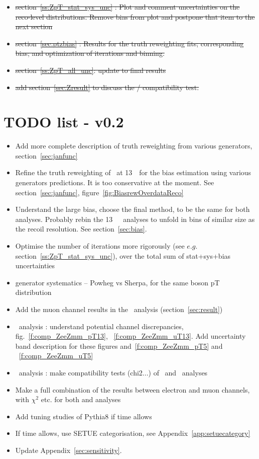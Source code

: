 \begin{itemize}
\begin{itemize}
    \item  {\sout{\color{red} section~\ref{ss:ZpT_stat_sys_unc} : Plot and comment uncertainties on the reco-level distributions. Remove bias from plot and postpone that item to the next section}}
    \item  {\sout{\color{red} section~\ref{sec:ptzbias} : Results for the truth reweighting fits; corresponding bias; and optimization of iterations and binning.}}
    \item  {\sout{\color{red} section~\ref{ss:ZpT_all_unc}: update to final results}}
    \item  {\sout{\color{red} add section~\ref{sec:Zresult} to discuss the \ut / \ptdilep compatibility test.}}
    \end{itemize}
\end{itemize}


\section*{TODO list - v0.2}

\begin{itemize}
\item Add more complete description of truth reweighting from various generators, section~\ref{sec:janfunc}
\item Refine the truth reweighting of \Wplus\ at 13~\TeV\ for the bias estimation using various generators predictions. It is too conservative at the moment. See section~\ref{sec:janfunc}, figure~\ref{fig:BiasrewOverdataReco}
\item Understand the large bias, choose the final method, to be the same for both analyses. Probably rebin the 13~\TeV\ \ut\ analyses to unfold in bins of similar size as the recoil resolution. See section~\ref{sec:bias}.
\item Optimise the number of iterations more rigorously (see $e.g.$ section~\ref{ss:ZpT_stat_sys_unc}), over the total sum of stat+sys+bias uncertainties
\item generator systematics -- Powheg vs Sherpa, for the same boson pT distribution
\item Add the muon channel results in the \ptw\ analysis (section~\ref{sec:result})
\item \ptz\ analysis : understand potential channel discrepancies, fig.~\ref{f:comp_ZeeZmm_pT13}, ~\ref{f:comp_ZeeZmm_uT13}. Add uncertainty band description for these figures and~\ref{f:comp_ZeeZmm_pT5} and ~\ref{f:comp_ZeeZmm_uT5}
\item \ptz\ analysis : make compatibility tests (chi2...) of \ut\ and \ptdilep\ analyses
\item Make a full combination of the results between electron and muon channels, with $\chi^2$ etc. for both \ptz and \ptw analyses
\item Add tuning studies of Pythia8 if time allows
\item If time allows, use SETUE categorisation, see Appendix~\ref{app:setuecategory}
\item Update Appendix~\ref{sec:sensitivity}.
\end{itemize}



